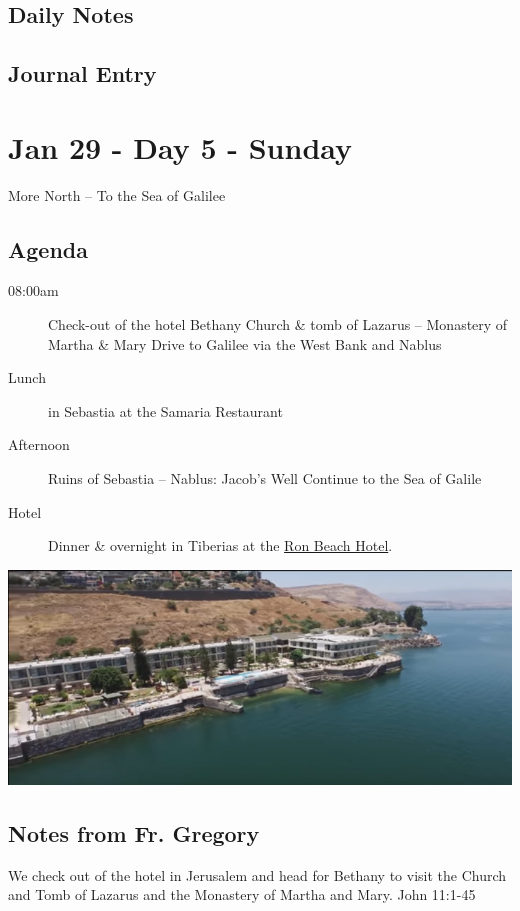 \documentclass[letterpaper]{report}
\begin{document}
\subsection{Daily Notes}

\clearpage
\subsection{Journal Entry}

\clearpage
\section{Jan 29 - Day 5 - Sunday}
More North -- To the Sea of Galilee
\subsection{Agenda}
\begin{description}
	\item[08:00am] Check-out of the hotel Bethany
	  \subitem Church \& tomb of Lazarus – Monastery of Martha \& Mary
	  \subitem Drive to Galilee via the West Bank and Nablus
	\item[Lunch] in Sebastia at the Samaria Restaurant
	\item[Afternoon] Ruins of Sebastia – Nablus: Jacob’s Well
	  \subitem Continue to the Sea of Galile
	\item[Hotel] Dinner \& overnight in Tiberias at the
	  \href{http://www.ronbeachhotel.com/}{Ron Beach Hotel}.
\end{description}

\includegraphics[width=\textwidth]{RonBeachHotel}

\subsection{Notes from Fr. Gregory}
We check out of the hotel in Jerusalem and head for Bethany to visit the 
Church and Tomb of Lazarus and the Monastery of Martha and Mary.
John 11:1-45
\end{document}
